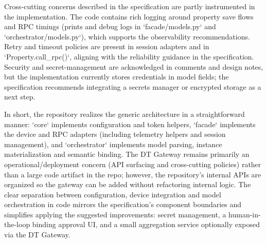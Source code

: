 \documentclass[11pt,a4paper]{article}
\begin{document}
Cross-cutting concerns described in the specification are partly instrumented in the implementation. The code contains rich logging around property save flows and RPC timings (prints and debug logs in `facade/models.py` and `orchestrator/models.py`), which supports the observability recommendations. Retry and timeout policies are present in session adapters and in `Property.call_rpc()`, aligning with the reliability guidance in the specification. Security and secret-management are acknowledged in comments and design notes, but the implementation currently stores credentials in model fields; the specification recommends integrating a secrets manager or encrypted storage as a next step.

In short, the repository realizes the generic architecture in a straightforward manner: `core` implements configuration and token helpers, `facade` implements the device and RPC adapters (including telemetry helpers and session management), and `orchestrator` implements model parsing, instance materialization and semantic binding. The DT Gateway remains primarily an operational/deployment concern (API surfacing and cross-cutting policies) rather than a large code artifact in the repo; however, the repository's internal APIs are organized so the gateway can be added without refactoring internal logic. The clear separation between configuration, device integration and model orchestration in code mirrors the specification's component boundaries and simplifies applying the suggested improvements: secret management, a human-in-the-loop binding approval UI, and a small aggregation service optionally exposed via the DT Gateway.
\end{document}
